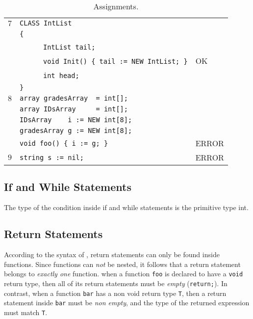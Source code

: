 \documentclass{article}
\begin{document}
\begin{table}[h]
\begin{tabular}{|l|l|l|}
 $7$ & \verb"CLASS IntList"                               &    \\
     & \verb"{"                                           &    \\
     & ~ ~ ~ ~\verb"IntList tail;"                        &    \\
     & ~ ~ ~ ~\verb"void Init() { tail := NEW IntList; }" & OK \\
     & ~ ~ ~ ~\verb"int head;"                            &    \\
     & \verb"}"                                           &    \\
\hline
 $8$ & \verb"array gradesArray  = int[];"   &       \\
     & \verb"array IDsArray     = int[];"   &       \\
     & \verb"IDsArray    i := NEW int[8];" &       \\
     & \verb"gradesArray g := NEW int[8];" &       \\
     & \verb"void foo() { i := g; }"       & ERROR \\
\hline
 $9$ & \verb"string s := nil;" & ERROR \\
\hline
\end{tabular}
\caption{Assignments.
\label{Table_Code_Examples_Assignments}}
\end{table}
\newpage
\subsection{If and While Statements}
\label{subsection_If_And_While_Statements}
The type of the condition inside if and while statements is the primitive type int.
\subsection{Return Statements}
\label{subsection_Return_Statements}
According to the syntax of \plname, return statements can only be found inside functions.
Since functions can \textit{not} be nested,
it follows that a return statement belongs to \textit{exactly one} function.
when a function \verb"foo" is declared to have a \verb"void" return type,
then all of its return statements must be \textit{empty} (\verb"return;").
In contrast, when a function \verb"bar" has a non void return type \verb"T",
then a return statement inside \verb"bar" must be \textit{non empty},
and the type of the returned expression must match \verb"T".
\end{document}
